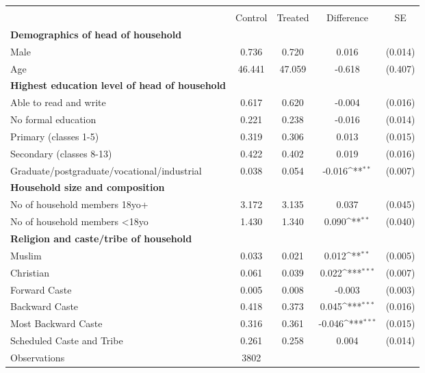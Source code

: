 {
\def\sym#1{\ifmmode^{#1}\else\(^{#1}\)\fi}
\begin{tabular}{l*{1}{cccc}}
\hline\hline
                    &\multicolumn{4}{c}{}                                        \\
                    &     Control&     Treated&  Difference         &          SE\\
\hline
\textbf{Demographics of head of household}&            &            &                     &            \\
Male                &       0.736&       0.720&       0.016         &     (0.014)\\
Age                 &      46.441&      47.059&      -0.618         &     (0.407)\\
\textbf{Highest education level of head of household}&            &            &                     &            \\
Able to read and write&       0.617&       0.620&      -0.004         &     (0.016)\\
No formal education &       0.221&       0.238&      -0.016         &     (0.014)\\
Primary (classes 1-5)&       0.319&       0.306&       0.013         &     (0.015)\\
Secondary (classes 8-13)&       0.422&       0.402&       0.019         &     (0.016)\\
Graduate/postgraduate/vocational/industrial&       0.038&       0.054&      -0.016\sym{**} &     (0.007)\\
\textbf{Household size and composition}&            &            &                     &            \\
No of household members 18yo+&       3.172&       3.135&       0.037         &     (0.045)\\
No of household members \textless{}18yo&       1.430&       1.340&       0.090\sym{**} &     (0.040)\\
\textbf{Religion and caste/tribe of household}&            &            &                     &            \\
Muslim              &       0.033&       0.021&       0.012\sym{**} &     (0.005)\\
Christian           &       0.061&       0.039&       0.022\sym{***}&     (0.007)\\
Forward Caste       &       0.005&       0.008&      -0.003         &     (0.003)\\
Backward Caste      &       0.418&       0.373&       0.045\sym{***}&     (0.016)\\
Most Backward Caste &       0.316&       0.361&      -0.046\sym{***}&     (0.015)\\
Scheduled Caste and Tribe&       0.261&       0.258&       0.004         &     (0.014)\\
\hline
Observations        &        3802&            &                     &            \\
\hline\hline
\end{tabular}
}
